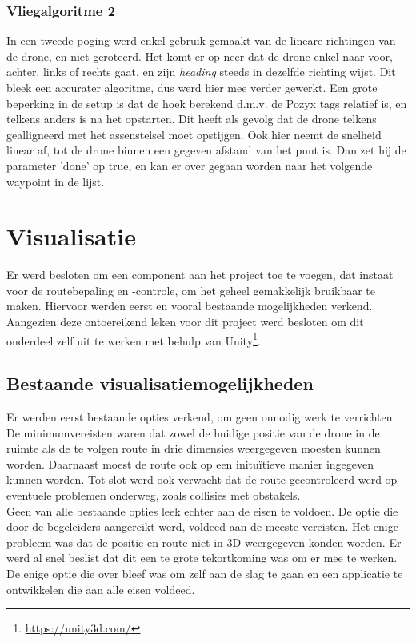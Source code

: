 \subsubsection{Vliegalgoritme 2}
In een tweede poging werd enkel gebruik gemaakt van de lineare richtingen van de drone, en niet geroteerd.
Het komt er op neer dat de drone enkel naar voor, achter, links of rechts gaat, en zijn \textit{heading} steeds in dezelfde richting wijst.
Dit bleek een accurater algoritme, dus werd hier mee verder gewerkt. Een grote beperking in de setup is dat de hoek berekend d.m.v. de Pozyx tags relatief is, en telkens anders is na het opstarten.
Dit heeft als gevolg dat de drone telkens gealligneerd met het assenstelsel moet opstijgen.
Ook hier neemt de snelheid linear af, tot de drone binnen een gegeven afstand van het punt is.
Dan zet hij de parameter ’done’ op true, en kan er over gegaan worden naar het volgende waypoint in de lijst.

\section{Visualisatie} \label{sec:visualization}
Er werd besloten om een component aan het project toe te voegen, dat instaat voor de routebepaling en -controle, om het geheel gemakkelijk bruikbaar te maken.
Hiervoor werden eerst en vooral bestaande mogelijkheden verkend.
Aangezien deze ontoereikend leken voor dit project werd besloten om dit onderdeel zelf uit te werken met behulp van Unity\footnote{\url{https://unity3d.com/}}.

\subsection{Bestaande visualisatiemogelijkheden} \label{sec:opties}
Er werden eerst bestaande opties verkend, om geen onnodig werk te verrichten.
De minimumvereisten waren dat zowel de huidige positie van de drone in de ruimte als de te volgen route in drie dimensies weergegeven moesten kunnen worden.
Daarnaast moest de route ook op een initu\"itieve manier ingegeven kunnen worden.
Tot slot werd ook verwacht dat de route gecontroleerd werd op eventuele problemen onderweg, zoals collisies met obstakels.\\

Geen van alle bestaande opties leek echter aan de eisen te voldoen.
De optie die door de begeleiders aangereikt werd, voldeed aan de meeste vereisten.
Het enige probleem was dat de positie en route niet in 3D weergegeven konden worden.
Er werd al snel beslist dat dit een te grote tekortkoming was om er mee te werken.
De enige optie die over bleef was om zelf aan de slag te gaan en een applicatie te ontwikkelen die aan alle eisen voldeed.

